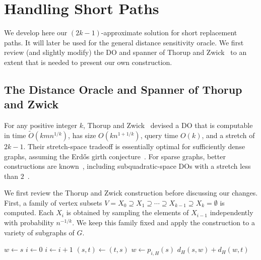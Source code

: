 \documentclass{article}\usepackage[a4paper,margin=20mm]{geometry}
\newcommand*{\Otilde}{\widetilde{O}}
\begin{document}
\section{Handling Short Paths}
\label{sec:short_paths}

We develop here our $(2k{-}1)$-approximate solution for short replacement paths.
It will later be used for the general distance sensitivity oracle.
We first review (and slightly modify) 
the DO and spanner of Thorup and Zwick~\cite{ThorupZ05}
to an extent that is needed to present our own construction.

\subsection{The Distance Oracle and Spanner of Thorup and Zwick}
\label{subsec:short_paths_TZ}

For any positive integer $k$, 
Thorup and Zwick~\cite{ThorupZ05} devised a DO
that is computable in time $\Otilde(kmn^{1/k})$, has size $O(kn^{1+1/k})$, query time $O(k)$,
and a stretch of $2k-1$.
Their stretch-space tradeoff is essentially optimal for sufficiently dense graphs,
assuming the Erdős girth conjecture~\cite{ThorupZ05}.
For sparse graphs, better constructions are known~\cite{Abraham11AffineStretch,PatrascuRoditty14BeyondThorupZwick,Patrascu11NewInfinity},
including subquadratic-space DOs with a stretch less than $2$~\cite{Agarwal14SpaceStretchTimeTradeoffDOs,AgarwalBrightenGodfrey13DOsStretchLessThan2}.

We first review the Thorup and Zwick construction before discussing our changes.
First, a family of vertex subsets 
$V = X_0 \supseteq X_1\supseteq \cdots \supseteq X_{k-1}  \supseteq X_k = \emptyset$ is computed.
Each $X_i$ is obtained by sampling the elements of $X_{i-1}$ independently with probability $n^{-1/k}$.
We keep this family fixed and
apply the construction to a variety of subgraphs of $G$.

\setcounter{AlgoLine}{0}
\begin{algorithm}[H]
    $w\gets s$\; 
    $i\gets 0$\; 
    {
        $i\gets i+1$\;
        $(s,t)\gets (t,s)$\;  
        $w\gets p_{i,H}(s)$\;
    }
    \Return $d_H(s,w)+d_H(w,t)$\;
\caption{Original query algorithm \cite{ThorupZ05} of the distance oracle for the pair $(s,t)$.}
\label{alg:query_TZ}
\end{algorithm}
 
\end{document}
